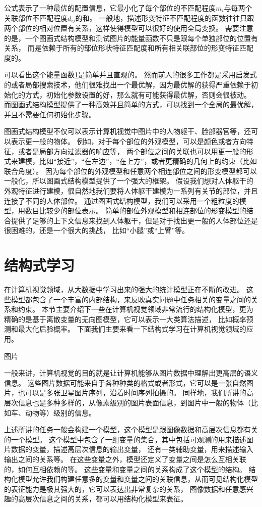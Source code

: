 公式表示了一种最优的配置信息，它最小化了每个部位的不匹配程度$m_i$与每两个关联部位不匹配程度$d_{ij}$的和。
一般地，描述形变特征不匹配程度的函数往往只跟两个部位的相对位置有关系，这样使得模型可以很好的使用全局变换。
需要注意的是，一个图画式结构模型和测试图片的能量函数不只是跟每个单独部位的位置有关系，
而是依赖于所有的部位形状特征匹配度和所有相关联部位的形变特征匹配度的。

可以看出这个能量函数\ref{}是简单并且直观的。
然而前人的很多工作都是采用启发式的或者局部搜索技术，他们很难找出一个最优解，因为最优解的获得严重依赖于初始化的方式，初始化参数设置的好，那么就有可能获得最优解，否则会很被动。
而图画式结构模型提供了一种高效并且简单的方式，可以找到一个全局的最优解，并且不需要任何初始化步骤。

图画式结构模型不仅可以表示计算机视觉中图片中的人物躯干、脸部器官等，还可以表示更一般的物体。
例如，对于每个部位的外观模型，可以是颜色或者方向特征，或者是局部方向过滤器的响应等，
两个部位之间的关联也可以用更一般的形式来建模，比如“接近”，“在左边”，“在上方”，或者更精确的几何上的约束（比如联合角度）。
因为每个部位的外观模型和任意两个相连部位之间的形变模型都可以一般化，所以图画式结构模型提供了一个强大的框架。
假设我们想对人体躯干的外观特征进行建模，很自然地我们要将人体躯干建模为一系列有关节的部位，并且连接了不同的人体部位。
通过图画式结构模型，我们可以采用一个粗粒度的模型，用数目比较少的部位表示。
简单的部位外观模型和相连部位的形变模型的结合提供了足够的上下文信息来找到人体躯干，但是对于找出更一般的人体部位还是很困难的，还是一个很大的挑战，
比如“小腿”或“上臂”等。

\section{结构式学习}
在计算机视觉领域，从大数据中学习出来的强大的统计模型正在不断的改进。
这些模型都包含了一个丰富的内部结构，来反映真实问题中任务相关的变量之间的关系和约束。
本节主要介绍下一些在计算机视觉领域非常流行的结构化模型，更为精确的是基于离散变量的无向图模型，它可以表示一大类算法描述，
比如概率预测和最大化后验概率。
下面我们主要来看一下结构式学习在计算机视觉领域的应用。

图片

一般来讲，计算机视觉的目的就是让计算机能够从图片数据中理解出更高层的语义信息。
这些图片数据可能来自于各种种类的格式或者形式，它可以是一张自然图片，也可以是多张卫星图片序列，沿着时间序列拍摄的。
同样地，我们所讲的高层次信息也是多种多样的，从像素级别的图片表面信息，到图片中一般的物体（比如车、动物等）级别的信息。

上述所讲的任务一般会构建一个模型，这个模型是跟图像数据和高层次信息都有关的一个模型。
这个模型中包含了一组变量的集合，其中包括可观测的用来描述图片数据的变量，描述高层次信息的输出变量，
还有一类辅助变量，用来描述输入输出之间的关系等。
在这些变量之外，模型还定义了变量之间是怎么互相关联的，如何互相依赖的等。
这些变量和变量之间的关系构成了这个模型的结构。
结构化模型允许我们构建任意多的变量和变量之间的关联信息，从而可见结构化模型的表征能力是极其强大的，它可以表达出非常复杂的关系，
图像数据和任意感兴趣的高层次信息之间的关系，都可以用结构化模型来表征。

